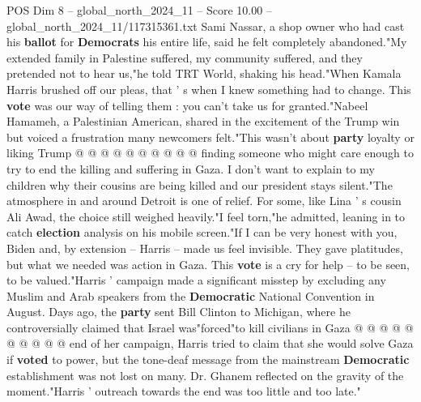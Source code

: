 \begin{textsample}{POS Dim 8 – global\_north\_2024\_11 – Score 10.00 – global\_north\_2024\_11/117315361.txt}
Sami Nassar, a shop owner who had cast his \textbf{ballot} for \textbf{Democrats} his entire life, said he felt completely abandoned."My extended family in Palestine suffered, my community suffered, and they pretended not to hear us,"he told TRT World, shaking his head."When Kamala Harris brushed off our pleas, that ' s when I knew something had to change.
This \textbf{vote} was our way of telling them : you can't take us for granted."Nabeel Hamameh, a Palestinian American, shared in the excitement of the Trump win but voiced a frustration many newcomers felt."This wasn't about \textbf{party} loyalty or liking Trump @ @ @ @ @ @ @ @ @ @ finding someone who might care enough to try to end the killing and suffering in Gaza.
I don't want to explain to my children why their cousins are being killed and our president stays silent."The atmosphere in and around Detroit is one of relief.
For some, like Lina ' s cousin Ali Awad, the choice still weighed heavily."I feel torn,"he admitted, leaning in to catch \textbf{election} analysis on his mobile screen."If I can be very honest with you, Biden and, by extension -- Harris -- made us feel invisible.
They gave platitudes, but what we needed was action in Gaza.
This \textbf{vote} is a cry for help -- to be seen, to be valued."Harris ' campaign made a significant misstep by excluding any Muslim and Arab speakers from the \textbf{Democratic} National Convention in August.
Days ago, the \textbf{party} sent Bill Clinton to Michigan, where he controversially claimed that Israel was"forced"to kill civilians in Gaza @ @ @ @ @ @ @ @ @ @ end of her campaign, Harris tried to claim that she would solve Gaza if \textbf{voted} to power, but the tone-deaf message from the mainstream \textbf{Democratic} establishment was not lost on many.
Dr.
Ghanem reflected on the gravity of the moment."Harris ' outreach towards the end was too little and too late."

\end{textsample}
